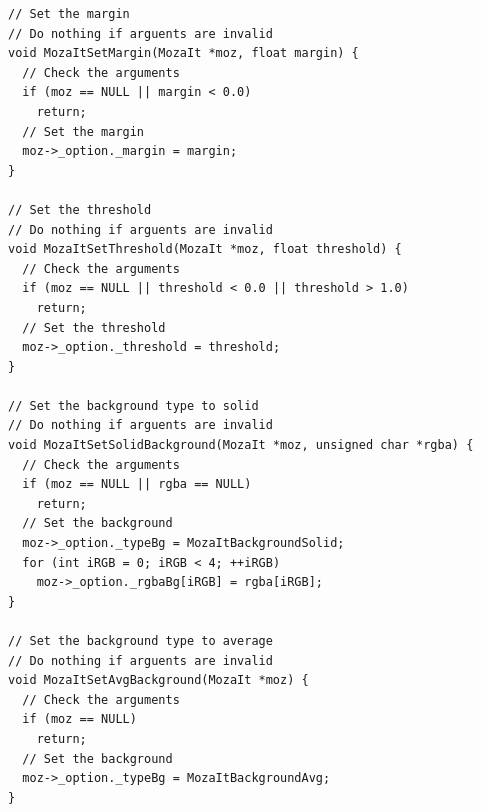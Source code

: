 \documentclass[12pt, a4paper]{article}
\begin{document}
\begin{scriptsize}
\begin{ttfamily}
\begin{lstlisting}
// Set the margin
// Do nothing if arguents are invalid
void MozaItSetMargin(MozaIt *moz, float margin) {
  // Check the arguments
  if (moz == NULL || margin < 0.0)
    return;
  // Set the margin
  moz->_option._margin = margin;
}

// Set the threshold
// Do nothing if arguents are invalid
void MozaItSetThreshold(MozaIt *moz, float threshold) {
  // Check the arguments
  if (moz == NULL || threshold < 0.0 || threshold > 1.0)
    return;
  // Set the threshold
  moz->_option._threshold = threshold;
}

// Set the background type to solid
// Do nothing if arguents are invalid
void MozaItSetSolidBackground(MozaIt *moz, unsigned char *rgba) {
  // Check the arguments
  if (moz == NULL || rgba == NULL)
    return;
  // Set the background
  moz->_option._typeBg = MozaItBackgroundSolid;
  for (int iRGB = 0; iRGB < 4; ++iRGB)
    moz->_option._rgbaBg[iRGB] = rgba[iRGB];
}

// Set the background type to average
// Do nothing if arguents are invalid
void MozaItSetAvgBackground(MozaIt *moz) {
  // Check the arguments
  if (moz == NULL)
    return;
  // Set the background
  moz->_option._typeBg = MozaItBackgroundAvg;
}


\end{lstlisting}
\end{ttfamily}
\end{scriptsize}
\end{document}
